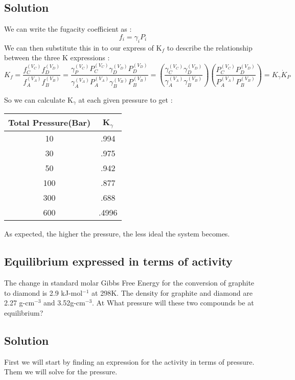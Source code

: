\documentclass{article}
\newcommand{\be}{\begin{equation}}
\newcommand{\ee}{\end{equation}}
\begin{document}
\subsection*{Solution}
We can write the fugacity coefficient as : 
\be
f_i=\gamma_i P_i
\ee
We can then substitute this in to our express of K$_f$ to describe the relationship between the three K expressions : 
\be
K_f = \frac{{f^{(V_C)}_Cf^{(V_D)}_D}}{{f^{(V_A)}_Af^{(V_B)}_B}} = \frac{{\gamma^{(V_C)}_PP^{(V_C)}_C\gamma^{(V_D)}_DP^{(V_D)}_D}}{{\gamma^{(V_A)}_AP^{(V_A)}_A\gamma^{(V_B)}_B}P^{(V_B)}_B} = \left(\frac{\gamma^{(V_C)}_C\gamma^{(V_D)}_D}{\gamma^{(V_A)}_A\gamma^{(V_B)}_B}\right)
\left(\frac{P^{(V_C)}_CP^{(V_D)}_D}{P^{(V_A)}_AP^{(V_B)}_B}\right) = K_\gamma \dot K_P
\ee

So we can calculate K$_\gamma$ at each given pressure to get : 

\begin{center}
 \begin{tabular}{||c | c  ||} 
 \hline
 Total Pressure(Bar) & K$_\gamma$  \\ [0.5ex] 
 \hline\hline
 10 & .994   \\ 
 \hline
 30 & .975   \\
 \hline
 50 & .942  \\
 \hline
 100 & .877  \\
 \hline
 300 & .688  \\  
 \hline
 600 & .4996 \\ 
 \hline
\end{tabular}
\end{center}

As expected, the higher the pressure, the less ideal the system becomes. 

\subsection{Equilibrium expressed in terms of activity}
The change in standard molar Gibbs Free Energy for the conversion of graphite to diamond is 2.9 kJ-mol$^{-1}$ at 298K. The density for graphite and diamond are 2.27 g-cm$^{-3}$ and 3.52g-cm$^{-3}$. At What pressure will these two compounds be at equilibrium? 

\subsection*{Solution}
First we will start by finding an expression for the activity in terms of pressure. 
Them we will solve for the pressure.
\end{document}
